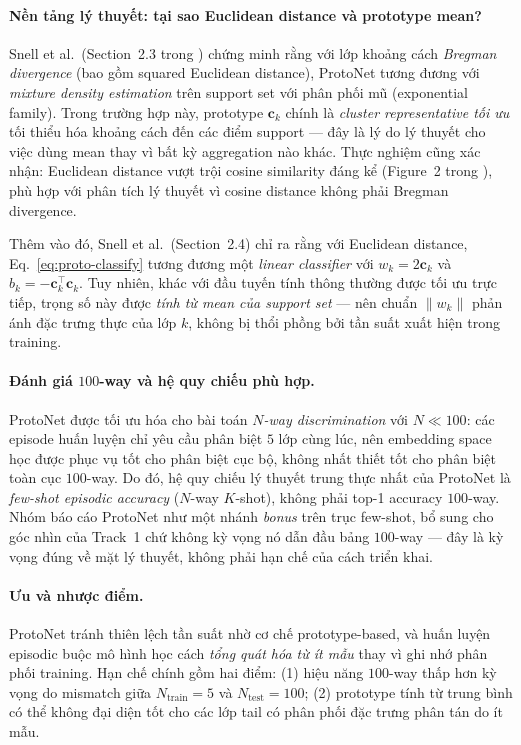 \paragraph{Nền tảng lý thuyết: tại sao Euclidean distance và prototype mean?}
Snell et al.\ (Section~2.3 trong \cite{snell2017protonet}) chứng minh
rằng với lớp khoảng cách \emph{Bregman divergence}
(bao gồm squared Euclidean distance),
ProtoNet tương đương với \emph{mixture density estimation} trên support set
với phân phối mũ (exponential family).
Trong trường hợp này, prototype $\mathbf{c}_k$ chính là
\emph{cluster representative tối ưu} tối thiểu hóa khoảng cách
đến các điểm support --- đây là lý do lý thuyết cho việc dùng mean
thay vì bất kỳ aggregation nào khác.
Thực nghiệm cũng xác nhận: Euclidean distance vượt trội cosine similarity
đáng kể (Figure~2 trong \cite{snell2017protonet}),
phù hợp với phân tích lý thuyết vì cosine distance
không phải Bregman divergence.

Thêm vào đó, Snell et al.\ (Section~2.4) chỉ ra rằng với Euclidean distance,
Eq.~\eqref{eq:proto-classify} tương đương một \emph{linear classifier}
với $w_k = 2\mathbf{c}_k$ và $b_k = -\mathbf{c}_k^\top \mathbf{c}_k$.
Tuy nhiên, khác với đầu tuyến tính thông thường được tối ưu trực tiếp,
trọng số này được \emph{tính từ mean của support set} ---
nên chuẩn $\lVert w_k \rVert$ phản ánh đặc trưng thực của lớp $k$,
không bị thổi phồng bởi tần suất xuất hiện trong training.

\paragraph{Đánh giá $100$-way và hệ quy chiếu phù hợp.}
ProtoNet được tối ưu hóa cho bài toán \emph{$N$-way discrimination}
với $N \ll 100$: các episode huấn luyện chỉ yêu cầu phân biệt $5$ lớp
cùng lúc, nên embedding space học được phục vụ tốt cho phân biệt cục bộ,
không nhất thiết tốt cho phân biệt toàn cục $100$-way.
Do đó, hệ quy chiếu lý thuyết trung thực nhất của ProtoNet là
\emph{few-shot episodic accuracy} ($N$-way $K$-shot),
không phải top-1 accuracy $100$-way.
Nhóm báo cáo ProtoNet như một nhánh \emph{bonus} trên trục few-shot,
bổ sung cho góc nhìn của Track~1 chứ không kỳ vọng nó dẫn đầu
bảng $100$-way --- đây là kỳ vọng đúng về mặt lý thuyết,
không phải hạn chế của cách triển khai.

\paragraph{Ưu và nhược điểm.}
ProtoNet tránh thiên lệch tần suất nhờ cơ chế prototype-based,
và huấn luyện episodic buộc mô hình học cách
\emph{tổng quát hóa từ ít mẫu} thay vì ghi nhớ phân phối training.
Hạn chế chính gồm hai điểm:
(1) hiệu năng $100$-way thấp hơn kỳ vọng do mismatch giữa
$N_{\text{train}} = 5$ và $N_{\text{test}} = 100$;
(2) prototype tính từ trung bình có thể không đại diện tốt
cho các lớp tail có phân phối đặc trưng phân tán do ít mẫu.

